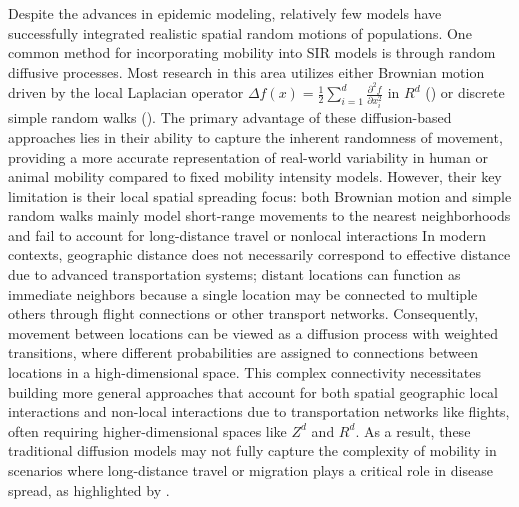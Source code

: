 \documentclass[sn-basic]{sn-jnl}%
\theoremstyle{thmstyleone}%
\theoremstyle{thmstyletwo}%
\theoremstyle{thmstylethree}%
\numberwithin{equation}{theorem}
\begin{document}






Despite the advances in epidemic modeling, relatively few models have successfully integrated realistic spatial random motions of populations. One common method for incorporating mobility into SIR models is through random diffusive processes. Most research in this area utilizes either Brownian motion driven by the local Laplacian operator $\Delta f(x)=\displaystyle\frac{1}{2}\sum\limits_{i=1}^d \frac{\partial^2 f}{\partial x_i^2}$ in $R^d$ (\citep{centres2024diffusion, faranda2020modeling}) or discrete simple random walks (\citep{hisi2019role}). The primary advantage of these diffusion-based approaches lies in their ability to capture the inherent randomness of movement, providing a more accurate representation of real-world variability in human or animal mobility compared to fixed mobility intensity models. However, their key limitation is their local spatial spreading focus: both Brownian motion and simple random walks mainly model short-range movements to the nearest neighborhoods and fail to account for long-distance travel or nonlocal interactions  In modern contexts, geographic distance does not necessarily correspond to effective distance due to advanced transportation systems; distant locations can function as immediate neighbors because a single location may be connected to multiple others through flight connections or other transport networks. Consequently, movement between locations can be viewed as a diffusion process with weighted transitions, where different probabilities are assigned to connections between locations in a high-dimensional space. This complex connectivity necessitates building more general approaches that account for both spatial geographic local interactions and non-local interactions due to transportation networks like flights, often requiring higher-dimensional spaces like $Z^d$ and $R^d$. As a result, these traditional diffusion models may not fully capture the complexity of mobility in scenarios where long-distance travel or migration plays a critical role in disease spread, as highlighted by \citep{colizza2007modeling, citron2021comparing,balcan2009multiscale}. 
\end{document}
